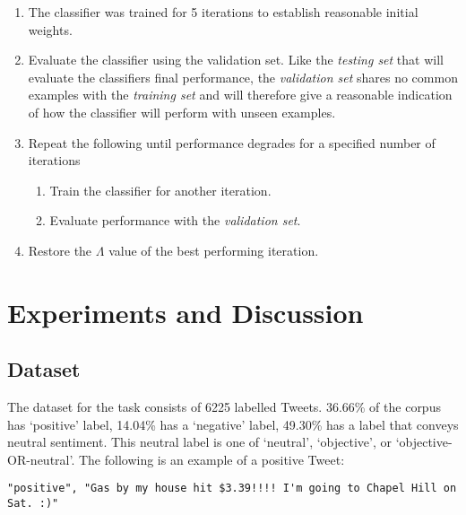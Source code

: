 \documentclass[final,3p,12pt]{elsarticle}
\begin{document}
\begin{enumerate}

    \item The classifier was trained for 5 iterations to establish reasonable
        initial weights.

    \item Evaluate the classifier using the validation set. Like the
        \textit{testing set} that will evaluate the classifiers final
        performance, the \textit{validation set} shares no common examples with
        the \textit{training set} and will therefore give a reasonable
        indication of how the classifier will perform with unseen examples.

    \item Repeat the following until performance degrades for a specified
        number of iterations

    \begin{enumerate}

        \item Train the classifier for another iteration.

        \item Evaluate performance with the \textit{validation set}.

    \end{enumerate}

    \item Restore the $\Lambda$ value of the best performing iteration.

\end{enumerate}

\section{Experiments and Discussion}
\label{section:experiments}

\subsection{Dataset}
\label{ssection:dataset}

The dataset for the task consists of 6225 labelled Tweets. 36.66\% of the
corpus has `positive' label, 14.04\% has a `negative' label, 49.30\% has a
label that conveys neutral sentiment. This neutral label is one of `neutral',
`objective', or `objective-OR-neutral'. The following is an example of a
positive Tweet:

\begin{Verbatim}[fontsize=\footnotesize]
"positive", "Gas by my house hit $3.39!!!! I'm going to Chapel Hill on Sat. :)"
\end{Verbatim}
\end{document}
